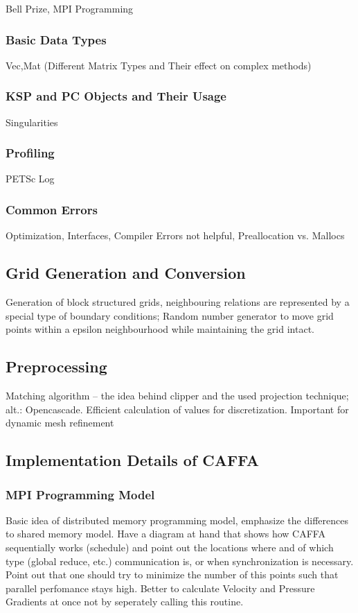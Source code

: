 \documentclass[article,type=msc,colorback,accentcolor=tud2a]{tudthesis}
\begin{document}
        Bell Prize, MPI Programming

      \subsubsection{Basic Data Types}

        Vec,Mat (Different Matrix Types and Their effect on complex methods)

      \subsubsection{KSP and PC Objects and Their Usage}

        Singularities

      \subsubsection{Profiling}

        PETSc Log 

      \subsubsection{Common Errors}

        Optimization, Interfaces, Compiler Errors not helpful, Preallocation vs. Mallocs

    \subsection{Grid Generation and Conversion}

      Generation of block structured grids, neighbouring relations are represented by a special type of boundary conditions; Random number generator to move grid points within a epsilon neighbourhood while maintaining the grid intact.
    \subsection{Preprocessing}
    Matching algorithm -- the idea behind clipper and the used projection technique; alt.: Opencascade. Efficient calculation of values for discretization. Important for dynamic mesh refinement
    \subsection{Implementation Details of CAFFA}

      \subsubsection{MPI Programming Model}
        Basic idea of distributed memory programming model, emphasize the differences to shared memory model. Have a diagram at hand that shows how CAFFA sequentially works (schedule) and point out the locations where and of which type (global reduce, etc.) communication is, or when synchronization is necessary. Point out that one should try to minimize the number of this points such that parallel perfomance stays high. Better to calculate Velocity and Pressure Gradients at once not by seperately calling this routine.
\end{document}
